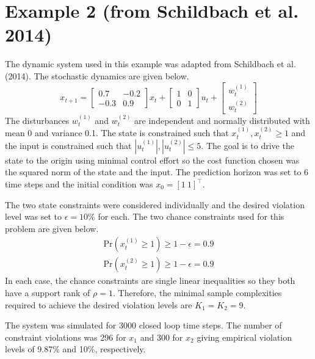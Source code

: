\documentclass[12 pt]{report}
\begin{document}
\section{Example 2 (from Schildbach et al. 2014)}

The dynamic system used in this example was adapted from Schildbach et al. (2014). The stochastic dynamics are given below. 
\begin{equation*}
x_{t+1} = \begin{bmatrix}
0.7 & -0.2 \\ -0.3 & 0.9
\end{bmatrix} x_t + 
\begin{bmatrix}
1 & 0 \\ 0 & 1
\end{bmatrix} u_t + 
\begin{bmatrix}
w_t^{(1)} \\ w_t^{(2)}
\end{bmatrix}
\end{equation*}
The disturbances $w_t^{(1)}$ and $w_t^{(2)}$ are independent and normally distributed with mean 0 and variance 0.1. The state is constrained such that $x_t^{(1)},  x_t^{(2)} \geq 1$ and the input is constrained such that $|u_t^{(1)}|, |u_t^{(2)}| \leq 5$. The goal is to drive the state to the origin using minimal control effort so the cost function chosen was the squared norm of the state and the input. The prediction horizon was set to 6 time steps and the initial condition was $x_0 = [1~ 1]^\top$.

The two state constraints were considered individually and the desired violation level was set to $\epsilon = 10\%$ for each. The two chance constraints used for this problem are given below.
\begin{align*}
\mathrm{Pr} (x_t^{(1)} \geq 1) \geq 1 - \epsilon = 0.9 \\
\mathrm{Pr} (x_t^{(2)} \geq 1) \geq 1 - \epsilon = 0.9
\end{align*}
In each case, the chance constraints are single linear inequalities so they both have a support rank of $\rho = 1$. Therefore, the minimal sample complexities required to achieve the desired violation levels are $K_1 = K_2 = 9$.

The system was simulated for 3000 closed loop time steps. The number of constraint violations was 296 for $x_1$ and 300 for $x_2$ giving empirical violation levels of 9.87\% and 10\%, respectively.
\end{document}
